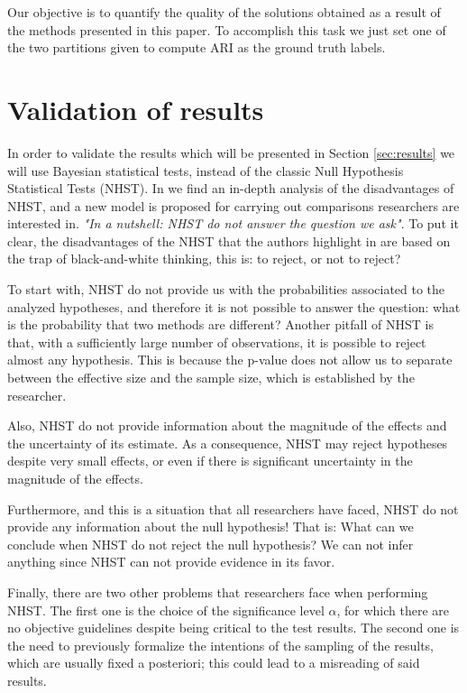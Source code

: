 Our objective is to quantify the quality of the solutions obtained as a result of the methods presented in this paper. To accomplish this task we just set one of the two partitions given to compute \acs{ARI} as the ground truth labels.

\section{Validation of results} \label{sec:ValidtnMethod}

In order to validate the results which will be presented in Section \ref{sec:results} we will use Bayesian statistical tests, instead of the classic Null Hypothesis Statistical Tests (NHST). In \cite{benavoli2017time} we find an in-depth analysis of the disadvantages of NHST, and a new model is proposed for carrying out comparisons researchers are interested in. \textit{"In a nutshell: NHST do not answer the question we ask"}. To put it clear, the disadvantages of the NHST that the authors highlight in \cite{benavoli2017time} are based on the trap of black-and-white thinking, this is: to reject, or not to reject?

To start with, NHST do not provide us with the probabilities associated to the analyzed hypotheses, and therefore it is not possible to answer the question: what is the probability that two methods are different? Another pitfall of NHST is that, with a sufficiently large number of observations, it is possible to reject almost any hypothesis. This is because the p-value does not allow us to separate between the effective size and the sample size, which is established by the researcher.

Also, NHST do not provide information about the magnitude of the effects and the uncertainty of its estimate. As a consequence, NHST may reject hypotheses despite very small effects, or even if there is significant uncertainty in the magnitude of the effects.

Furthermore, and this is a situation that all researchers have faced, NHST do not provide any information about the null hypothesis! That is: What can we conclude when NHST do not reject the null hypothesis? We can not infer anything since NHST can not provide evidence in its favor.

Finally, there are two other problems that researchers face when performing NHST. The first one is the choice of the significance level $\alpha$, for which there are no objective guidelines despite being critical to the test results. The second one is the need to previously formalize the intentions of the sampling of the results, which are usually fixed a posteriori; this could lead to a misreading of said results.

